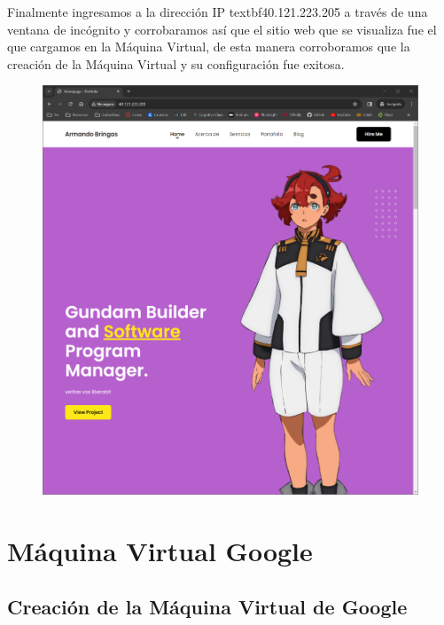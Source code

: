 \documentclass[12pt,a4paper]{article}
\begin{document}
\vspace{25em}

Finalmente ingresamos a la dirección IP textbf{40.121.223.205} a través de una ventana de incógnito y corrobaramos así que el sitio web que se visualiza fue el que cargamos en la Máquina Virtual, de esta manera corroboramos que la creación de la Máquina Virtual y su configuración fue exitosa.

\begin{figure}[H]
    \centering
    \includegraphics[width=1\linewidth]{M4_Servicios_Cómputo_en_la_Nube/Tarea_5_Creación_Máquinas_Virtuales_en_Nube/reporte/figuras/1_4_2_Carga_archivos.png}
    \label{fig:Azure_8}
\end{figure}

\section{Máquina Virtual Google}

\subsection{Creación de la Máquina Virtual de Google}
\end{document}
